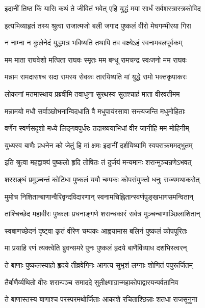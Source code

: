 \twolineshloka
{इदानीं तिष्ठ किं यासि कथं ते जीवितं भवेत्}
{एहि युद्धं मया सार्धं सर्वशस्त्रास्त्रकोविद}%

\twolineshloka
{इत्यभिव्याहृतं तस्य श्रुत्वा राजात्मजो बली}
{जगाद पुष्कलं वीरो मेघगम्भीरया गिरा}%


\twolineshloka
{न नाम्ना न कुलेनेदं युद्धमत्र भविष्यति}
{तथापि तव वक्ष्येऽहं स्वनामबलपूर्वकम्}%

\twolineshloka
{मम माता राघवेशो मत्पिता राघवः स्मृतः}
{मम बन्धू रामचन्द्र स्वःजनो मम राघवः}%

\twolineshloka
{मन्नाम रामदासश्च सदा रामस्य सेवकः}
{तारयिष्यति मां युद्धे रामो भक्तकृपाकरः}%

\twolineshloka
{लोकानां मतमास्थाय प्रब्रवीमि तवाधुना}
{सुरथस्य सुतश्चाहं माता वीरवतीमम}%

\twolineshloka
{मन्नामयो मधौ सर्वाञ्छोभनान्विदधाति वै}
{मधुपायंरसावा सन्त्यजन्ति मधुमोहिताः}%

\twolineshloka
{वर्णेन स्वर्णसदृशो मध्ये लिङ्गवपुर्धरः}
{तदाख्ययाभिधां वीर जानीहि मम मोहिनीम्}%

\twolineshloka
{युध्यस्व बाणैः प्रधनेन को जेतुं हि मां क्षमः}
{इदानीं दर्शयिष्यामि स्वपराक्रममद्भुतम्}%


\twolineshloka
{इति श्रुत्वा महद्वाक्यं पुष्कलो हृदि तोषितः}
{तं दुर्जयं मन्यमानः शरान्मुञ्चन्रणेऽभवत्}%

\twolineshloka
{शरसङ्घं प्रमुञ्चन्तं कोटिधा पुष्कलं ययौ}
{चम्पकः कोपसंयुक्तो धनुः सज्यमथाकरोत्}%

\twolineshloka
{मुमोच निशितान्बाणान्वैरिवृन्दविदारणान्}
{स्वनामचिह्नितान्स्वर्णपुङ्खभागसमन्वितान्}%

\twolineshloka
{तांश्चिच्छेद महावीरः पुष्कलः प्रधनाङ्गणे}
{शरान्धकारं सर्वत्र मुञ्चन्बाणाञ्छिलाशितान्}%

\twolineshloka
{स्वबाणच्छेदनं दृष्ट्वा कृतं वीरेण चम्पकः}
{आह्वयामास बलिनं पुष्कलं कोपपूरितः}%

\twolineshloka
{मा प्रयाहि रणं त्यक्त्वेति ब्रुवन्समरे पुनः}
{पुष्कलं हृदये बाणैर्विव्याध दशभिस्त्वरन्}%

\twolineshloka
{ते बाणाः पुष्कलस्याहो हृदये तीव्रवेगिनः}
{आगत्य सुभृशं लग्नाः शोणितं पपुरूर्जितम्}%

\twolineshloka
{तैर्बाणैर्व्यथितो वीरः शरान्पञ्च समाददे}
{सुतीक्ष्णाग्रान्महाकोपाद्वारयन्पर्वतानिव}%

\twolineshloka
{ते बाणास्तस्य बाणाश्च परस्परमथोर्जिताः}
{आकाशे रचिताश्छिन्नाः शतधा राजसूनुना}%

